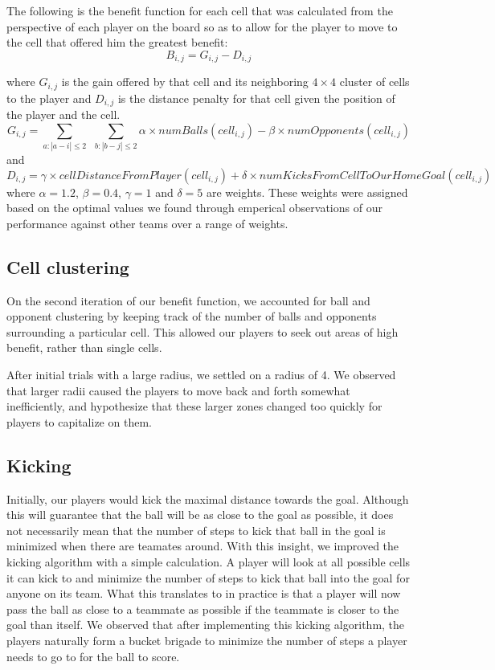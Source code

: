 \documentclass[
10pt, %
letterpaper, %
oneside, %
headinclude,footinclude, %
english
]{article}
\begin{document}
The following is the benefit function for each cell that was calculated from the perspective of each player on the board so as to allow for the player to move to the cell that offered him the greatest benefit: 
$$B_{i, j} = G_{i, j} - D_{i,j} $$

where $G_{i, j}$ is the gain offered by that cell and its neighboring $4 \times 4$ cluster of cells to the player and $D_{i, j}$ is the distance penalty for that cell given the position of the player and the cell. $$G_{i, j} = \sum_{a : |a - i| \leq 2}\ \ \sum_{b : |b - j| \leq 2} \alpha \times numBalls(cell_{i, j}) - \beta \times numOpponents(cell_{i,j}) $$ and $$D_{i, j} = \gamma \times cellDistanceFromPlayer(cell_{i,j}) + \delta \times numKicksFromCellToOurHomeGoal(cell_{i, j})$$ where $\alpha = 1.2$, $\beta = 0.4$, $\gamma = 1$ and $\delta = 5$ are weights. These weights were assigned based on the optimal values we found through emperical observations of our performance against other teams over a range of weights.

\subsection{Cell clustering}
On the second iteration of our benefit function, we accounted for ball and opponent clustering by keeping track of the number of balls and opponents surrounding a particular cell. This allowed our players to seek out areas of high benefit, rather than single cells. 

After initial trials with a large radius, we settled on a radius of 4. We observed that larger radii caused the players to move back and forth somewhat inefficiently, and hypothesize that these larger zones changed too quickly for players to capitalize on them.

\subsection{Kicking}
Initially, our players would kick the maximal distance towards the goal. Although this will guarantee that the ball will be as close to the goal as possible, it does not necessarily mean that the number of steps to kick that ball in the goal is minimized when there are teamates around. With this insight, we improved the kicking algorithm with a simple calculation. A player will look at all possible cells it can kick to and minimize the number of steps to kick that ball into the goal for anyone on its team. What this translates to in practice is that a player will now pass the ball as close to a teammate as possible if the teammate is closer to the goal than itself. We observed that after implementing this kicking algorithm, the players naturally form a bucket brigade to minimize the number of steps a player needs to go to for the ball to score.
\end{document}

